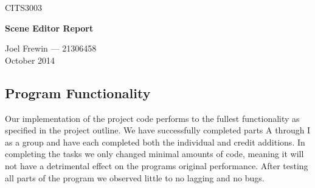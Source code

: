 \documentclass[a4paper, 11pt, titlepage]{article}
\begin{document}
\begin{center}
CITS3003\par
{\bf \Large Scene Editor Report} \par
Joel Frewin --- 21306458\\
October 2014
\end{center}


\subsection*{Program Functionality} 
Our implementation of the project code performs to the fullest functionality as specified in the project outline. We have successfully completed parts A through I as a group and have each completed both the individual and credit additions. In completing the tasks we only changed minimal amounts of code, meaning it will not have a detrimental effect on the programs original performance. After testing all parts of the program we observed little to no lagging and no bugs. 
 
\end{document}
